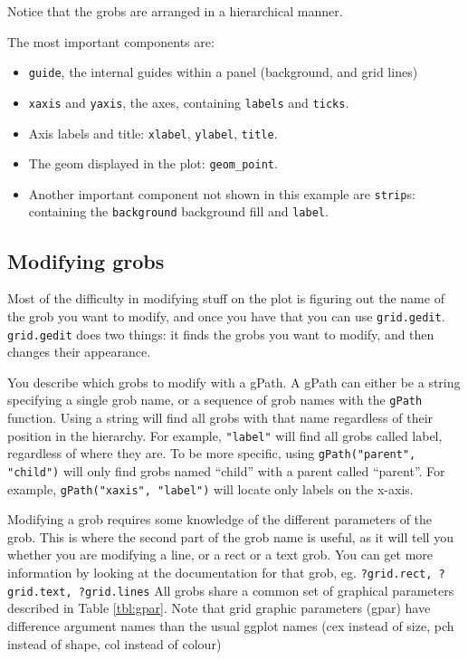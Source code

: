 Notice that the grobs are arranged in a hierarchical manner. 

The most important components are:

\begin{itemize}
  \item {\tt guide}, the internal guides within a panel (background, and grid lines)

  \item {\tt xaxis} and {\tt yaxis}, the axes, containing {\tt labels} and {\tt ticks}.

	\item Axis labels and title: {\tt xlabel}, {\tt ylabel}, {\tt title}.

  \item The geom displayed in the plot: {\tt geom\_point}.

	\item Another important component not shown in this example are {\tt strip}s: containing the {\tt background} background fill and {\tt label}.

\end{itemize}

\subsection{Modifying grobs}

Most of the difficulty in modifying stuff on the plot is figuring out the name of the grob you want to modify, and once you have that you can use {\tt grid.gedit}.  {\tt grid.gedit} does two things: it finds the grobs you want to modify, and then changes their appearance.  

You describe which grobs to modify with a gPath.  A gPath can either be a string specifying a single grob name, or a sequence of grob names with the {\tt gPath} function.  Using a string will find all grobs with that name regardless of their position in the hierarchy.  For example, {\tt "label"} will find all grobs called label, regardless of where they are.  To be more specific, using {\tt gPath("parent", "child")} will only find grobs named ``child'' with a parent called ``parent''.  For example, {\tt gPath("xaxis", "label")} will locate only labels on the x-axis.

Modifying a grob requires some knowledge of the different parameters of the grob.  This is where the second part of the grob name is useful, as it will tell you whether you are modifying a line, or a rect or a text grob.  You can get more information by looking at the documentation for that grob, eg. {\tt ?grid.rect, ?grid.text, ?grid.lines}   All grobs share a common set of graphical parameters described in Table \ref{tbl:gpar}.  Note that grid graphic parameters (gpar) have difference argument names than the usual ggplot names (cex instead of size, pch instead of shape, col instead of colour)

